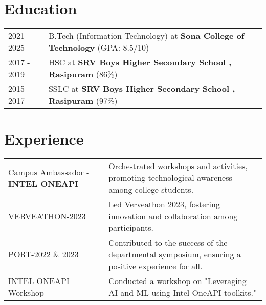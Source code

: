 \documentclass[a4paper,12pt]{article}
\begin{document}
\section{Education}
\begin{tabularx}{\linewidth}{@{}l X@{}}	
2021 - 2025 & B.Tech (Information Technology) at \textbf{Sona College of Technology} \hfill \normalsize (GPA: 8.5/10) \\


2017 - 2019 & HSC at \textbf{SRV Boys Higher Secondary School , Rasipuram} \hfill  (86\%) \\

2015 - 2017 & SSLC at \textbf{SRV Boys Higher Secondary School , Rasipuram} \hfill  (97\%) \\
\end{tabularx}





\section{Experience}
\begin{tabularx}{\linewidth}{@{}l X@{}}
Campus Ambassador - \textbf{INTEL ONEAPI} &  \normalsize{Orchestrated workshops and activities, promoting technological awareness among college students.}\\
VERVEATHON-2023 &  \normalsize{Led Verveathon 2023, fostering innovation and collaboration among participants.}\\
PORT-2022 \& 2023 &  \normalsize{Contributed to the success of the departmental symposium, ensuring a positive experience for all.}\\
INTEL ONEAPI Workshop & \normalsize{Conducted a workshop on "Leveraging AI and ML using Intel OneAPI toolkits."}\\
\end{tabularx}



\vfill
{}
\end{document}
